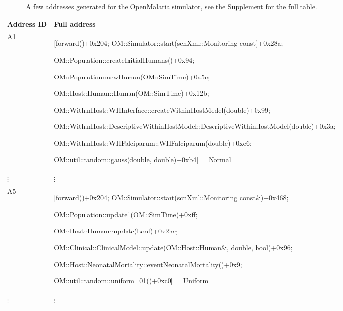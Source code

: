 \documentclass{article}
\begin{document}
 \begin{table}[h!]
  \footnotesize
  \setlength{\tabcolsep}{1mm}
  \caption{A few addresses generated for the OpenMalaria simulator, see the Supplement for the full table.}
  \label{table:addresses}
  \def\arraystretch{1.25}
  \begin{tabularx}{\textwidth}{@{}lX@{}} 
    \toprule
    Address ID & Full address \\
    \midrule
  A1 & [forward()+0x204; OM::Simulator::start(scnXml::Monitoring const)+0x28a;

  OM::Population::createInitialHumans()+0x94;

  OM::Population::newHuman(OM::SimTime)+0x5c;

  OM::Host::Human::Human(OM::SimTime)+0x12b;

  OM::WithinHost::WHInterface::createWithinHostModel(double)+0x99;

  OM::WithinHost::DescriptiveWithinHostModel::DescriptiveWithinHostModel(double)+0x3a;

  OM::WithinHost::WHFalciparum::WHFalciparum(double)+0xe6;

  OM::util::random::gauss(double, double)+0xb4]\_\_Normal\\

   $\vdots$ & $\vdots$ \\
  A5 & [forward()+0x204; OM::Simulator::start(scnXml::Monitoring const\&)+0x468;

   OM::Population::update1(OM::SimTime)+0xff;

    OM::Host::Human::update(bool)+0x2bc;

    OM::Clinical::ClinicalModel::update(OM::Host::Human\&, double, bool)+0x96;

    OM::Host::NeonatalMortality::eventNeonatalMortality()+0x9;

    OM::util::random::uniform\_01()+0xc0]\_\_Uniform\\


 $\vdots$ & $\vdots$ \\

\bottomrule
  \end{tabularx}
  \end{table}



\end{document}
